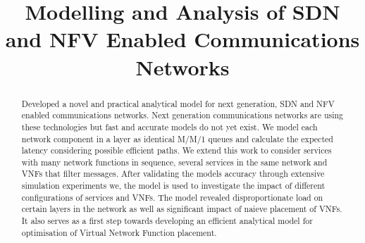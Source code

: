 \documentclass[conference]{IEEEtran}
\begin{document}
\title{Modelling and Analysis of SDN and NFV Enabled Communications Networks}

\author{
}

\maketitle

\begin{abstract}
Developed a novel and practical analytical model for next generation, SDN and NFV enabled communications networks. Next generation communications networks are using these technologies but fast and accurate models do not yet exist. We model each network component in a layer as identical M/M/1 queues and calculate the expected latency considering possible efficient paths. We extend this work to consider services with many network functions in sequence, several services in the same network and VNFs that filter messages. After validating the models accuracy through extensive simulation experiments we, the model is used to investigate the impact of different configurations of services and VNFs. The model revealed disproportionate load on certain layers in the network as well as significant impact of naieve placement of VNFs. It also serves as a first step towards developing an efficient analytical model for optimisation of Virtual Network Function placement.
\end{abstract}
















\end{document}
